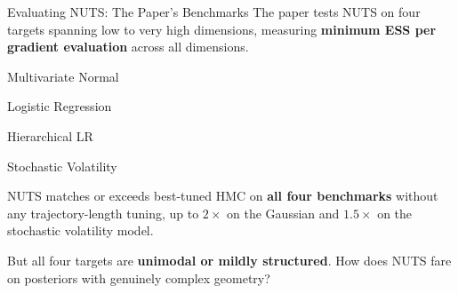 \documentclass{beamer}
\begin{document}
\begin{frame}{Evaluating NUTS: The Paper's Benchmarks}
    The paper tests NUTS on four targets spanning low to very high dimensions, measuring \textbf{minimum ESS per gradient evaluation} across all dimensions.

    \vspace{0.2cm}
    \noindent
    \begin{minipage}[t]{0.22\textwidth}\centering
      \begin{tcolorbox}[stressbox, title=250-D, halign=center]
        \footnotesize Multivariate Normal
      \end{tcolorbox}
    \end{minipage}
    \hfill
    \begin{minipage}[t]{0.22\textwidth}\centering
      \begin{tcolorbox}[stressbox, title=25-D, halign=center]
        \footnotesize Logistic Regression
      \end{tcolorbox}
    \end{minipage}
    \hfill
    \begin{minipage}[t]{0.22\textwidth}\centering
      \begin{tcolorbox}[stressbox, title=302-D, halign=center]
        \footnotesize Hierarchical LR
      \end{tcolorbox}
    \end{minipage}
    \hfill
    \begin{minipage}[t]{0.22\textwidth}\centering
      \begin{tcolorbox}[stressbox, title=3001-D, halign=center]
        \footnotesize Stochastic Volatility
      \end{tcolorbox}
    \end{minipage}

    \vspace{0.3cm}
    \begin{tcolorbox}[keybox]
      NUTS matches or exceeds best-tuned HMC on \textbf{all four benchmarks} without
      any trajectory-length tuning, up to $2\times$ on the Gaussian and $1.5\times$ on the
      stochastic volatility model.
    \end{tcolorbox}

    \vspace{0.15cm}
    But all four targets are \textbf{unimodal or mildly structured}. How does NUTS fare on posteriors with genuinely complex geometry?
\end{frame}
\end{document}
